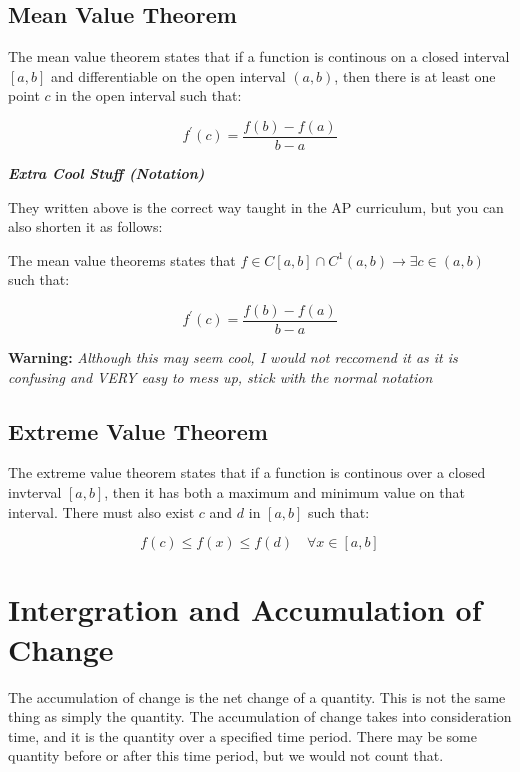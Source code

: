 \documentclass[12pt]{article}
\begin{document}
        \subsection{Mean Value Theorem}

        The mean value theorem states that if a function is continous on a closed interval $[a, b]$ and differentiable on the 
        open interval $(a, b)$, then there is at least one point $c$ in the open interval such that: 

        \[
            f^{\prime}(c) = \frac{f(b) - f(a)}{b - a}    
        \]

        \noindent \textbf{\textit{Extra Cool Stuff (Notation)}}

        They written above is the correct way taught in the AP curriculum, but you can also shorten it as follows:

        The mean value theorems states that $f \in C[a, b] \cap C^1(a, b) \to \exists c\in(a, b)$ such that: 

        \[
            f^{\prime}(c) = \frac{f(b) - f(a)}{b - a}    
        \]

        \textbf{Warning: }\textit{Although this may seem cool, I would not reccomend it as it is confusing and VERY easy to mess up, stick with the normal notation}

        \subsection{Extreme Value Theorem}

        The extreme value theorem states that if a function is continous over a closed invterval $[a, b]$, then it has both a 
        maximum and minimum value on that interval. There must also exist $c$ and $d$ in $[a, b]$ such that:

        \[
            f(c) \le f(x) \le f(d) \quad \forall x \in [a, b]    
        \]

        \section{Intergration and Accumulation of Change}

        The accumulation of change is the net change of a quantity. This is not the same
        thing as simply the quantity. The accumulation of change takes into consideration time, 
        and it is the quantity over a specified time period. There may be some quantity before or 
        after this time period, but we would not count that. 
\end{document}
